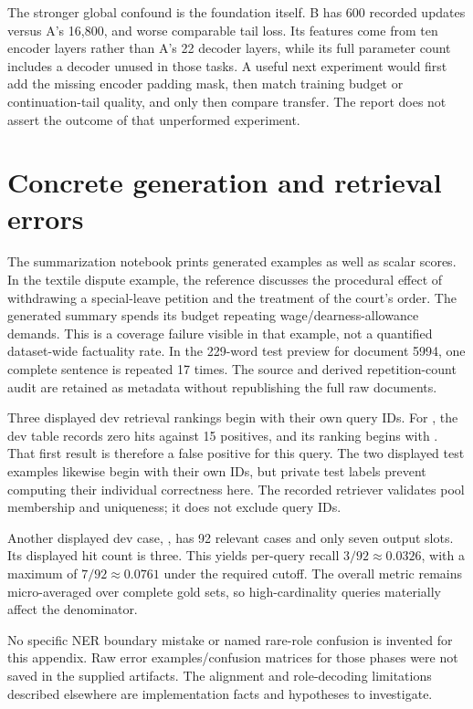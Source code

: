 The stronger global confound is the foundation itself. B has 600 recorded updates versus A's 16,800,
and worse comparable tail loss. Its features come from ten encoder layers rather than A's 22 decoder
layers, while its full parameter count includes a decoder unused in those tasks. A useful next experiment
would first add the missing encoder padding mask, then match training budget or continuation-tail quality,
and only then compare transfer. The report does not assert the outcome of that unperformed experiment.

\section{Concrete generation and retrieval errors}
\label{app:examples}
The summarization notebook prints generated examples as well as scalar scores. In the textile dispute
example, the reference discusses the procedural effect of withdrawing a special-leave petition and the
treatment of the court's order. The generated summary spends its budget repeating wage/dearness-allowance
demands. This is a coverage failure visible in that example, not a quantified dataset-wide factuality rate.
In the 229-word test preview for document 5994, one complete sentence is repeated 17 times. The source and
derived repetition-count audit are retained as metadata without republishing the full raw documents.

Three displayed dev retrieval rankings begin with their own query IDs. For , the
dev table records zero hits against 15 positives, and its ranking begins with .
That first result is therefore a false positive for this query. The two displayed test examples likewise
begin with their own IDs, but private test labels prevent computing their individual correctness here.
The recorded retriever validates pool membership and uniqueness; it does not exclude query IDs.

Another displayed dev case, , has 92 relevant cases and only seven output slots.
Its displayed hit count is three. This yields per-query recall $3/92\approx0.0326$, with a maximum of
$7/92\approx0.0761$ under the required cutoff. The overall metric remains micro-averaged over complete
gold sets, so high-cardinality queries materially affect the denominator.

No specific NER boundary mistake or named rare-role confusion is invented for this appendix. Raw error
examples/confusion matrices for those phases were not saved in the supplied artifacts. The alignment and
role-decoding limitations described elsewhere are implementation facts and hypotheses to investigate.


